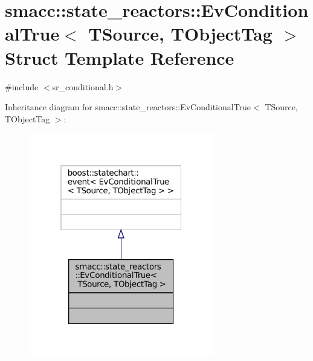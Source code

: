 \hypertarget{structsmacc_1_1state__reactors_1_1EvConditionalTrue}{}\section{smacc\+:\+:state\+\_\+reactors\+:\+:Ev\+Conditional\+True$<$ T\+Source, T\+Object\+Tag $>$ Struct Template Reference}
\label{structsmacc_1_1state__reactors_1_1EvConditionalTrue}


{\ttfamily \#include $<$sr\+\_\+conditional.\+h$>$}



Inheritance diagram for smacc\+:\+:state\+\_\+reactors\+:\+:Ev\+Conditional\+True$<$ T\+Source, T\+Object\+Tag $>$\+:
\nopagebreak
\begin{figure}[H]
\begin{center}
\leavevmode
\includegraphics[width=229pt]{structsmacc_1_1state__reactors_1_1EvConditionalTrue__inherit__graph}
\end{center}
\end{figure}


